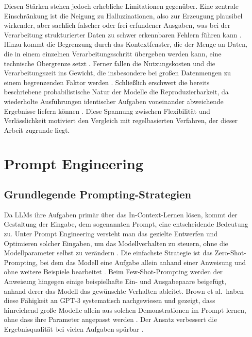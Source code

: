 Diesen Stärken stehen jedoch erhebliche Limitationen gegenüber. Eine zentrale Einschränkung ist die Neigung zu Halluzinationen, also zur Erzeugung plausibel wirkender, aber sachlich falscher oder frei erfundener Ausgaben, was bei der Verarbeitung strukturierter Daten zu schwer erkennbaren Fehlern führen kann \autocite{hassaniRoleChatGPTData2023,zhaoSurveyLargeLanguage2026}. Hinzu kommt die Begrenzung durch das Kontextfenster, die der Menge an Daten, die in einem einzelnen Verarbeitungsschritt übergeben werden kann, eine technische Obergrenze setzt \autocite{zhaoSurveyLargeLanguage2026}. Ferner fallen die Nutzungskosten und die Verarbeitungszeit ins Gewicht, die insbesondere bei großen Datenmengen zu einem begrenzenden Faktor werden \autocite{zhaoSurveyLargeLanguage2026,2026AIIndex}. Schließlich erschwert die bereits beschriebene probabilistische Natur der Modelle die Reproduzierbarkeit, da wiederholte Ausführungen identischer Aufgaben voneinander abweichende Ergebnisse liefern können \autocite{zhaoSurveyLargeLanguage2026,hassaniRoleChatGPTData2023}. Diese Spannung zwischen Flexibilität und Verlässlichkeit motiviert den Vergleich mit regelbasierten Verfahren, der dieser Arbeit zugrunde liegt.

\section{Prompt Engineering}
\label{sec:prompting}

\subsection{Grundlegende Prompting-Strategien}
\label{subsec:prompting-strategien}

Da \acp{LLM} ihre Aufgaben primär über das In-Context-Lernen lösen, kommt der Gestaltung der Eingabe, dem sogenannten Prompt, eine entscheidende Bedeutung zu. Unter Prompt Engineering versteht man das gezielte Entwerfen und Optimieren solcher Eingaben, um das Modellverhalten zu steuern, ohne die Modellparameter selbst zu verändern \autocite{sahooSystematicSurveyPrompt,schulhoffPromptReportSystematic2025}. Die einfachste Strategie ist das Zero-Shot-Prompting, bei dem das Modell eine Aufgabe allein anhand einer Anweisung und ohne weitere Beispiele bearbeitet \autocite{liuPretrainPromptPredict2023,sahooSystematicSurveyPrompt}. Beim Few-Shot-Prompting werden der Anweisung hingegen einige beispielhafte Ein- und Ausgabepaare beigefügt, anhand derer das Modell das gewünschte Verhalten ableitet. Brown et al.\ haben diese Fähigkeit an GPT-3 systematisch nachgewiesen und gezeigt, dass hinreichend große Modelle allein aus solchen Demonstrationen im Prompt lernen, ohne dass ihre Parameter angepasst werden \autocite{brownLanguageModelsFewShot2020}. Der Ansatz verbessert die Ergebnisqualität bei vielen Aufgaben spürbar \autocite{liuPretrainPromptPredict2023,sahooSystematicSurveyPrompt}.

